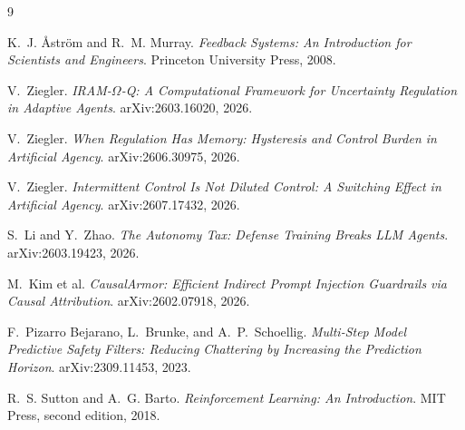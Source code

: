 \documentclass[11pt]{article}
\begin{document}
\begin{thebibliography}{9}
\small
\setlength{\itemsep}{3pt}

K.~J. \r{A}str\"om and R.~M. Murray.
\newblock \emph{Feedback Systems: An Introduction for Scientists and Engineers}.
\newblock Princeton University Press, 2008.

V.~Ziegler.
\newblock \emph{IRAM-$\Omega$-Q: A Computational Framework for Uncertainty
Regulation in Adaptive Agents}.
\newblock arXiv:2603.16020, 2026.

V.~Ziegler.
\newblock \emph{When Regulation Has Memory: Hysteresis and Control Burden
in Artificial Agency}.
\newblock arXiv:2606.30975, 2026.

V.~Ziegler.
\newblock \emph{Intermittent Control Is Not Diluted Control: A Switching Effect
in Artificial Agency}.
\newblock arXiv:2607.17432, 2026.

S.~Li and Y.~Zhao.
\newblock \emph{The Autonomy Tax: Defense Training Breaks LLM Agents}.
\newblock arXiv:2603.19423, 2026.

M.~Kim et al.
\newblock \emph{CausalArmor: Efficient Indirect Prompt Injection Guardrails
via Causal Attribution}.
\newblock arXiv:2602.07918, 2026.

F.~Pizarro Bejarano, L.~Brunke, and A.~P.~Schoellig.
\newblock \emph{Multi-Step Model Predictive Safety Filters: Reducing Chattering
by Increasing the Prediction Horizon}.
\newblock arXiv:2309.11453, 2023.

R.~S. Sutton and A.~G. Barto.
\newblock \emph{Reinforcement Learning: An Introduction}.
\newblock MIT Press, second edition, 2018.

\end{thebibliography}
\end{document}
